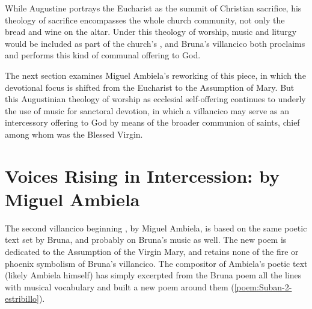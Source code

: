 While Augustine portrays the Eucharist as the summit of Christian sacrifice, his theology of sacrifice encompasses the whole church community, not only the bread and wine on the altar.
Under this theology of worship, music and liturgy would be included as part of the church's , and Bruna's villancico both proclaims and performs this kind of communal offering to God.

The next section examines Miguel Ambiela's reworking of this piece, in which the devotional focus is shifted from the Eucharist to the Assumption of Mary.
But this Augustinian theology of worship as ecclesial self-offering continues to underly the use of music for sanctoral devotion, in which a villancico may serve as an intercessory offering to God by means of the broader communion of saints, chief among whom was the Blessed Virgin. 

\section{%
Voices Rising in Intercession: 
 by Miguel Ambiela
}


The second villancico beginning , by Miguel Ambiela, is based on the same poetic text set by Bruna, and probably on Bruna's music as well.
The new poem is dedicated to the Assumption of the Virgin Mary, and retains none of the fire or phoenix symbolism of Bruna's villancico.
The compositor of Ambiela's poetic text (likely Ambiela himself) has simply excerpted from the Bruna poem all the lines with musical vocabulary and built a new poem around them (\cref{poem:Suban-2-estribillo}).

% 	

